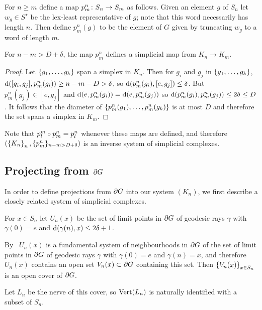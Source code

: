 \documentclass[a4paper]{article}
\begin{document}
\begin{definition}
  For $n \geq m$ define a map $p^n_m \colon S_n \to S_m$ as follows.
  Given an element $g$ of $S_n$ let $w_g \in S^\star$ be the lex-least 
  representative of $g$; note that this word necessarily has length $n$.
  Then define $p^n_m(g)$ to be the element of $G$ given by truncating $w_g$ to a 
  word of length $m$.
\end{definition}

\begin{lemma}\label{lem:psimplicial}
  For $n - m > D + \delta$, the map $p^n_m$ defines a simplicial map from
  $K_n \to K_m$.
\end{lemma}

\begin{proof}
  Let $\left\{g_1, \dotsc, g_k\right\}$ span a simplex in $K_n$.
  Then for $g_i$ and $g_j$ in $\left\{g_1, \dotsc, g_k\right\}$, $\operatorname{d}([g_i, g_j], 
  p^n_m(g_i)) \geq n - m - D > \delta$, so $\operatorname{d}(p^n_m(g_i), [e, g_j]) \leq 
  \delta$.  But $p^n_m(g_j) \in [e, g_j]$ and $\operatorname{d}(e, p^n_m(g_i)) = 
  \operatorname{d}(e, p^n_m(g_j))$ so $\operatorname{d}(p^n_m(g_i), p^n_m(g_j)) \leq 2\delta 
  \leq D$. It follows that the diameter of $\left\{p^n_m(g_1), \dotsc, 
  p^n_m(g_k)\right\}$ is at most $D$ and therefore the set spans a simplex in $K_m$.
\end{proof}

Note that $p^m_l \circ p^n_m = p^n_l$ whenever these maps are defined, and 
therefore $(\left\{K_n\right\}_n, \{p^n_m\}_{n - m > D + \delta})$ is an inverse system 
of simplicial complexes.

\subsection{Projecting from $\partial G$}

In order to define projections from $\partial G$ into our system $(K_n)$, we
first describe a closely related system of simplicial complexes.

\begin{definition}
  For $x \in S_n$ let $U_n(x)$ be the set of limit points in $\partial G$ of 
  geodesic rays $\gamma$ with $\gamma(0) = e$ and $\operatorname{d}(\gamma(n), x) \leq 
  2\delta+1$.  
  
  By~\cite{bridsonhaefliger99} $U_n(x)$ is a fundamental system of 
  neighbourhoods in $\partial G$ of the set of limit points in $\partial G$ of 
  geodesic rays $\gamma$ with $\gamma(0) = e$ and $\gamma(n) = x$, and therefore 
  $U_n(x)$ contains an open set $V_n(x) \subset \partial G$ containing this 
  set. Then $\left\{V_n(x)\right\}_{x \in S_n}$ is an open cover of $\partial G$.
  
  Let $L_n$ be the nerve of this cover, so $\operatorname{Vert}(L_n)$ is naturally 
  identified with a subset of $S_n$.
\end{definition}
\end{document}
